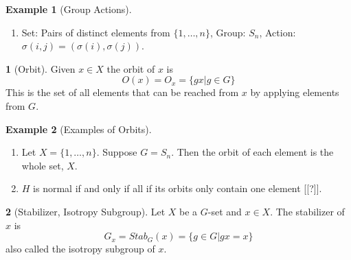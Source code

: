 \documentclass[12pt]{article}
\theoremstyle{definition}
\newtheorem{definition}{\color{NavyBlue}{\textbf{Definition}}}
\newtheorem{example}{\color{WildStrawberry}Example}
\theoremstyle{definition}
\begin{document}
\begin{example}[Group Actions]
\begin{enumerate}
\begin{enumerate}
		\item Identity: Note that $1 \in H$ since $H \leq G$. Thus $g1g^{-1} = 1\in gHg^{-1}$. 
		\item Closed under products: Let $ghg^{-1}, gh'g^{-1} \in gHg^{-1}$. Then
		\begin{align*}
			(ghg^{-1})(gh'g^{-1}) &= ghh'g^{-1} \\
			&= g\tilde{h} g^{-1} \in gHg^{-1} \tag{$H$ closed under multiplication}
		\end{align*}
		\item Closed under inverses: Note that $(ghg^{-1})^{-1} = gh^{-1}g^{-1} \in H$ since $H$ is closed under inverses. 
	\end{enumerate}
	Therefore $gHg^{-1}$ is a subgroup. Now, let's verify the axioms to should this is indeed an action [[?]]:
	\begin{enumerate}
		\item $1 gHg^{-1}= gHg^{-1}$
		\item ??
	\end{enumerate}
	\item Set: Pairs of distinct elements from $\{1, \ldots, n\}$, Group: $S_n$, Action: $\sigma(i,j) = (\sigma(i), \sigma(j))$. 
\end{enumerate}
\end{example}

\begin{definition}[Orbit]
Given $x \in X$ the orbit of $x$ is 
\begin{equation}
	O(x) = O_x = \{gx | g \in G\}
\end{equation}
This is the set of all elements that can be reached from $x$ by applying elements from $G$. 
\end{definition}

\begin{example}[Examples of Orbits]
\begin{enumerate}
	\item Let $X = \{1, \ldots, n\}$. Suppose $G = S_n$. Then the orbit of each element is the whole set, $X$. 
	\item $H$ is normal if and only if all if its orbits only contain one element [[?]]. 
\end{enumerate}
\end{example}

\begin{definition}[Stabilizer, Isotropy Subgroup]
Let $X$ be a $G$-set and $x \in X$. The stabilizer of $x$ is 
\begin{equation}
	G_x = Stab_G(x) = \{ g\in G | gx = x \}
\end{equation}
also called the isotropy subgroup of $x$. 
\end{definition}
\end{document}
